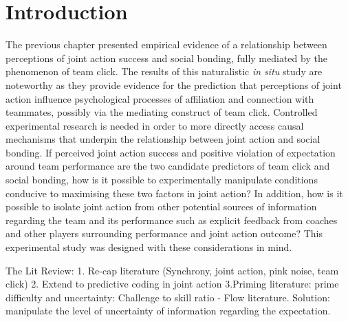 %


\section{Introduction}

The previous chapter presented empirical evidence of a relationship between perceptions of joint action success and social bonding, fully mediated by the phenomenon of team click.    The results of this naturalistic \textit{in situ} study are noteworthy as they provide evidence for the prediction that perceptions of joint action influence psychological processes of affiliation and connection with teammates, possibly via the mediating construct of team click.  Controlled experimental research is needed in order to more directly access causal mechanisms that underpin the relationship between joint action and social bonding.  If perceived joint action success and positive violation of expectation around team performance are the two candidate predictors of team click and social bonding, how is it possible to experimentally manipulate conditions conducive to maximising these two factors in joint action? In addition, how is it possible to isolate joint action from other potential sources of information regarding the team and its performance such as explicit feedback from coaches and other players surrounding performance and joint action outcome? This experimental study was designed with these considerations in mind.



The Lit Review:
1. Re-cap literature (Synchrony, joint action, pink noise, team click)
2. Extend to predictive coding in joint action
3.Priming literature: prime difficulty and uncertainty:
          Challenge to skill ratio - Flow literature.
Solution: manipulate the level of uncertainty of information regarding the expectation.



